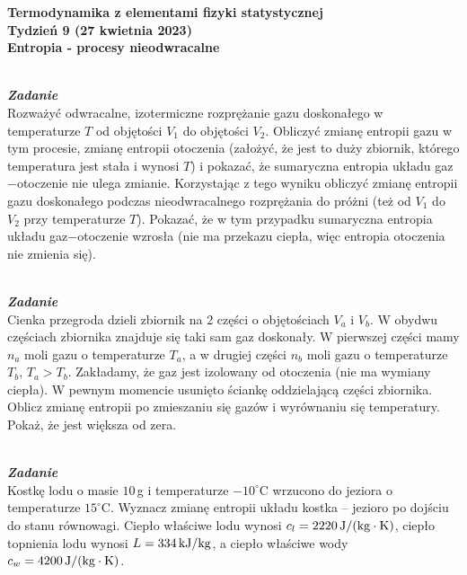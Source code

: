 \documentclass[11pt,a4paper]{article}
\newcounter{zadanie}\newcommand{\zadanie}[1][]{\addtocounter{zadanie}{1} ~\\  {\bf \emph{Zadanie \arabic{zadanie} #1 }} \\}
\begin{document}

\begin{centering}
\bf{\Large{Termodynamika z elementami fizyki statystycznej}}\\
Tydzień 9 (27 kwietnia 2023)\\[3mm]
Entropia - procesy nieodwracalne\\
\end{centering}
\vspace{5mm}

\zadanie
Rozważyć odwracalne, izotermiczne rozprężanie gazu doskonałego w temperaturze $T$
od objętości $V_1$ do objętości $V_2$. Obliczyć zmianę entropii gazu w tym
procesie, zmianę entropii otoczenia (założyć, że jest to duży zbiornik, którego
temperatura jest stała i wynosi $T$) i pokazać, że sumaryczna entropia układu gaz$-$otoczenie
nie ulega zmianie.
Korzystając z tego wyniku obliczyć zmianę entropii gazu doskonałego
podczas nieodwracalnego rozprężania do próżni (też od $V_1$ do $V_2$ przy temperaturze $T$). Pokazać, że w tym przypadku sumaryczna entropia
układu gaz$-$otoczenie wzrosła (nie ma przekazu ciepła, więc entropia otoczenia
nie zmienia się).
\newline


\zadanie
Cienka przegroda dzieli zbiornik na 2 części o objętościach $V_a$ i $V_b$.
W obydwu częściach zbiornika znajduje się taki sam gaz doskonały.
W pierwszej części mamy $n_a$ moli gazu o temperaturze $T_a$, a w drugiej części $n_b$ moli
gazu o temperaturze $T_b$, $T_a >  T_b$.
Zakładamy, że gaz jest izolowany od otoczenia (nie ma wymiany ciepła).
W pewnym momencie usunięto ściankę oddzielającą części zbiornika.
Oblicz zmianę entropii po zmieszaniu się
gazów i wyrównaniu się temperatury. Pokaż, że jest większa od zera.
\newline


\zadanie
Kostkę lodu o masie $10\,$g i temperaturze $-10^\circ$C wrzucono do jeziora o
temperaturze $15^\circ$C.
Wyznacz zmianę entropii układu kostka -- jezioro po dojściu do
stanu równowagi. Ciepło właściwe lodu wynosi $c_l = 2220\,{\rm J/(kg\cdot K)}$,
ciepło topnienia lodu wynosi $L = 334\,{\rm kJ/kg}$, a ciepło właściwe
wody $c_w = 4200\,{\rm J/(kg\cdot K)}$.
\newline
\end{document}
